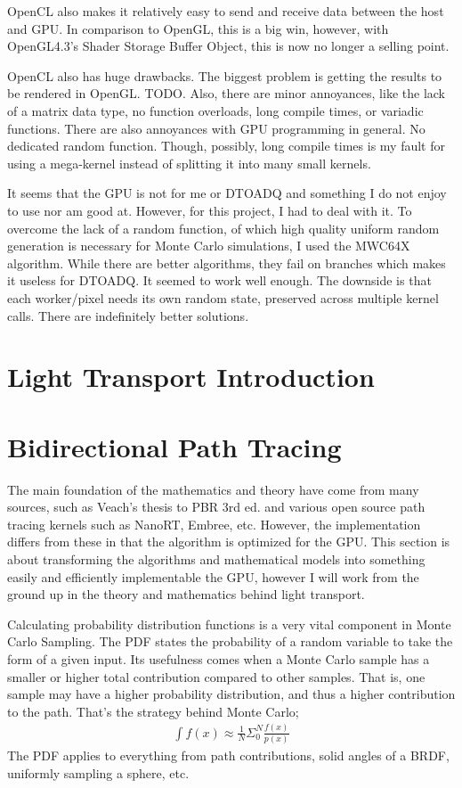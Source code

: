 \documentclass{article}
\begin{document}
  	OpenCL also makes it relatively easy to send and receive data between the
host and GPU. In comparison to OpenGL, this is a big win, however, with
OpenGL4.3's Shader Storage Buffer Object, this is now no longer a selling point.
  	
  	OpenCL also has huge drawbacks. The biggest problem is getting the results
to be rendered in OpenGL. TODO. Also, there are minor annoyances, like the lack
of a matrix data type, no function overloads, long compile times, or variadic
functions. There are also annoyances with GPU programming in general. No
dedicated random function. Though, possibly, long compile times is my fault for
using a mega-kernel instead of splitting it into many small kernels.
  	
  	It seems that the GPU is not for me or DTOADQ and something I do not enjoy
to use nor am good at. However, for this project, I had to deal with it. To
overcome the lack of a random function, of which high quality uniform random
generation is necessary for Monte Carlo simulations, I used the MWC64X
algorithm. While there are better algorithms, they fail on branches which makes
it useless for DTOADQ. It seemed to work well enough. The downside is that each
worker/pixel needs its own random state, preserved across multiple kernel calls.
There are indefinitely better solutions.
  \section{Light Transport Introduction}
  \section{Bidirectional Path Tracing}
    The main foundation of the mathematics and theory have come from many
sources, such as Veach's thesis to PBR 3rd ed. and various open source path
tracing kernels such as NanoRT, Embree, etc. However, the implementation differs
from these in that the algorithm is optimized for the GPU. This section is about
transforming the algorithms and mathematical models into something easily and
efficiently implementable the GPU, however I will work from the ground up in the
theory and mathematics behind light transport.

    Calculating probability distribution functions is a very vital component in
Monte Carlo Sampling. The PDF states the probability of a random variable to
take the form of a given input. Its usefulness comes when a Monte Carlo
sample has a smaller or higher total contribution compared to other samples.
That is, one sample may have a higher probability distribution, and thus a
higher contribution to the path. That's the strategy behind Monte Carlo;
    \begin{align}
      \int f(x) \approx \frac{1}{N}\Sigma_0^N\frac{f(x)}{p(x)}
    \end{align}
    The PDF applies to everything from path contributions, solid angles of a
    BRDF, uniformly sampling a sphere, etc.
    
\end{document}

